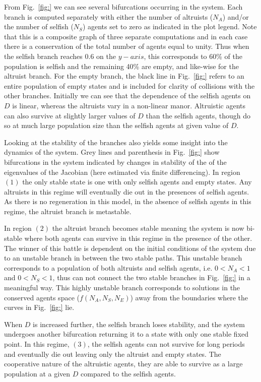 \documentclass[11pt]{article}
\begin{document}
\newpage

From Fig.~\ref{fig:} we can see several bifurcations occurring in the system. Each branch is computed separately with either the number of altruists ($N_A$) and/or the number of selfish ($N_S$) agents set to zero as indicated in the plot legend. Note that this is a composite graph of three separate computations and in each case there is a conservation of the total number of agents equal to unity. Thus when the selfish branch reaches 0.6 on the $y-axis$, this corresponds to 60\% of the population is selfish and the remaining 40\% are empty, and like-wise for the altruist branch. For the empty branch, the black line in Fig.~\ref{fig:} refers to an entire population of empty states and is included for clarity of collisions with the other branches. Initially we can see that the dependence of the selfish agents on $D$ is linear, whereas the altruists vary in a non-linear manor. Altruistic agents can also survive at slightly larger values of $D$ than the selfish agents, though do so at much large population size than the selfish agents at given value of $D$.

Looking at the stability of the branches also yields some insight into the dynamics of the system. Grey lines and parenthesis in Fig.~\ref{fig:} show bifurcations in the system indicated by changes in stability of the of the eigenvalues of the Jacobian (here estimated via finite differencing). In region $(1)$ the only stable state is one with only selfish agents and empty states. Any altruists in this regime will eventually die out in the presences of selfish agents. As there is no regeneration in this model, in the absence of selfish agents in this regime, the altruist branch is metastable. 

In region $(2)$ the altruist branch becomes stable meaning the system is now bi-stable where both agents can survive in this regime in the presence of the other. The winner of this battle is dependent on the initial conditions of the system due to an unstable branch in between the two stable paths. This unstable branch corresponds to a population of both altruists and selfish agents, i.e. $0<N_A<1$ and $0<N_S<1$, thus can not connect the two stable branches in Fig.~\ref{fig:} in a meaningful way. This highly unstable branch corresponds to solutions in the conserved agents space ($f(N_A,N_S,N_E)$) away from the boundaries where the curves in Fig.~\ref{fig:} lie. 

When $D$ is increased further, the selfish branch loses stability, and the system undergoes another bifurcation returning it to a state with only one stable fixed point. In this regime, $(3)$, the selfish agents can not survive for long periods and eventually die out leaving only the altruist and empty states. The cooperative nature of the altruistic agents, they are able to survive as a large population at a given $D$ compared to the selfish agents. 
\end{document}
